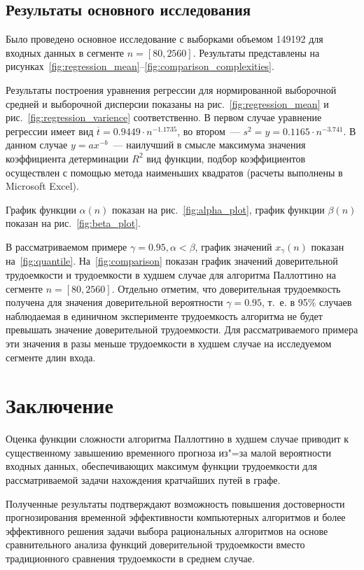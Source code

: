 \documentclass[a4paper,fontsize=14pt]{article}
\begin{document}
\subsection{Результаты основного исследования} \label{subsec:results_part_2}

Было проведено основное исследование с выборками объемом 149192 для входных данных в сегменте $n = [80, 2560]$. Результаты представлены на рисунках~\ref{fig:regression_mean}--\ref{fig:comparison_complexities}.

Результаты построения уравнения регрессии для нормированной выборочной средней и выборочной дисперсии показаны на рис.~\ref{fig:regression_mean} и рис.~\ref{fig:regression_varience} соответственно. В первом случае уравнение регрессии имеет вид $\overline{t} = 0.9449 \cdot n^{-1.1735}$, во втором~--- $s^2 = y = 0.1165 \cdot n^{-3.741}$. В данном случае $y = ax^{-b}$~--- наилучший в смысле максимума значения коэффициента детерминации $R^2$ вид функции, подбор коэффициентов осуществлен с помощью метода наименьших квадратов (расчеты выполнены в Microsoft Excel).

График функции $\alpha(n)$ показан на рис.~\ref{fig:alpha_plot}, график функции $\beta(n)$ показан на рис.~\ref{fig:beta_plot}.

В рассматриваемом примере $\gamma = 0.95, \alpha < \beta$, график значений $x_\gamma(n)$ показан на~\ref{fig:quantile}. На~\ref{fig:comparison} показан график значений доверительной трудоемкости и трудоемкости в худшем случае для алгоритма Паллоттино на сегменте $n = [80, 2560]$. Отдельно отметим, что доверительная трудоемкость получена для значения доверительной вероятности $\gamma = 0.95$, т.~е. в 95\% случаев наблюдаемая в единичном эксперименте трудоемкость алгоритма не будет превышать значение доверительной трудоемкости. Для рассматриваемого примера эти значения в разы меньше трудоемкости в худшем случае на исследуемом сегменте длин входа.

\section{Заключение} \label{sec:conclusion}

Оценка функции сложности алгоритма Паллоттино в худшем случае приводит к существенному завышению временного прогноза из"=за малой вероятности входных данных, обеспечивающих максимум функции трудоемкости для рассматриваемой задачи нахождения кратчайших путей в графе.

Полученные результаты подтверждают возможность повышения достоверности прогнозирования временной эффективности компьютерных алгоритмов и более эффективного решения задачи выбора рациональных алгоритмов на основе сравнительного анализа функций доверительной трудоемкости вместо традиционного сравнения трудоемкости в среднем случае.
\end{document}
